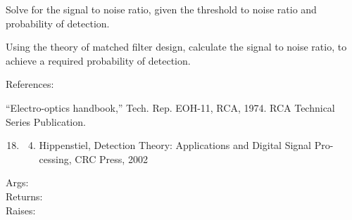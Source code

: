 \documentclass[a4paper,10pt,english]{sphinxmanual}
\begin{document}

\begin{fulllineitems}
\label{ryutils:pyradi.ryutils.detectSignalToNoise}
Solve for the signal to noise ratio, given the threshold to noise ratio and
probability of detection.

Using the theory of matched filter design, calculate the
signal to noise ratio, to achieve a required probability of detection.

References:

``Electro-optics handbook,'' Tech. Rep. EOH-11, RCA, 1974. RCA Technical Series Publication.
\begin{enumerate}
\setcounter{enumi}{17}
\item {} \begin{enumerate}
\setcounter{enumi}{3}
\item {} 
Hippenstiel, Detection Theory: Applications and Digital Signal Pro-cessing, CRC Press, 2002

\end{enumerate}

\end{enumerate}
\begin{description}
\item[{Args:}] \leavevmode
{}

\item[{Returns:}] \leavevmode
{}

\item[{Raises:}] \leavevmode
{}

\end{description}

\end{fulllineitems}
\end{document}
